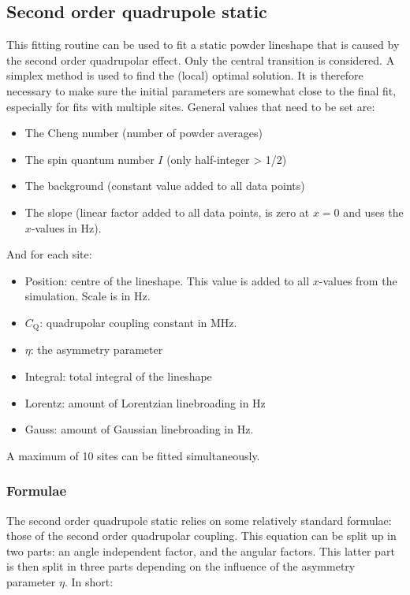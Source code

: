 \documentclass[11pt,a4paper]{article}
\begin{document}
\subsection{Second order quadrupole static}
This fitting routine can be used to fit a static powder lineshape that is caused by the second order quadrupolar effect. Only the central transition is considered. A simplex method is used to find the (local) optimal solution. It is therefore necessary to make sure the initial parameters are somewhat close to the final fit, especially for fits with multiple sites. General values that need to be set are:
\begin{itemize}
\item The Cheng number (number of powder averages)
\item The spin quantum number $I$ (only half-integer > 1/2)
\item The background (constant value added to all data points)
\item The slope (linear factor added to all data points, is zero at $x=0$ and uses the $x$-values in Hz).
\end{itemize}
And for each site:
\begin{itemize}
\item Position: centre of the lineshape. This value is added to all $x$-values from the simulation. Scale is in Hz.
\item $C_\text{Q}$: quadrupolar coupling constant in MHz.
\item $\eta$: the asymmetry parameter
\item Integral: total integral of the lineshape
\item Lorentz: amount of Lorentzian linebroading in Hz
\item Gauss: amount of Gaussian linebroading in Hz.
\end{itemize}
A maximum of 10 sites can be fitted simultaneously.


\subsubsection*{Formulae}
The second order quadrupole static relies on some relatively standard formulae: those of the second order quadrupolar coupling. This equation can be split up in two parts: an angle independent factor, and the angular factors. This latter part is then split in three parts depending on the influence of the asymmetry parameter $\eta$. In short:
\end{document}
